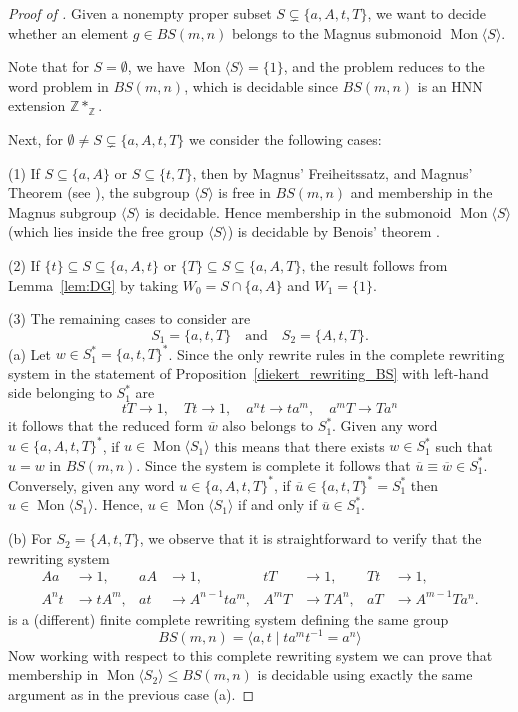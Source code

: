 \documentclass[11pt]{amsart}
\newcommand{\Mgen}[1]{\operatorname{Mon}\bigl\langle #1 \bigr\rangle}
\theoremstyle{plain}
\theoremstyle{definition}
\begin{document}
\begin{proof}[Proof of ]

Given a nonempty proper subset $S \subsetneq \{a, A, t, T\}$, we want to decide whether an element $g \in BS(m,n)$ belongs to the Magnus submonoid $\Mgen{S}$.

Note that for $S = \emptyset$, we have $\Mgen{S} = \{1\}$, and the problem reduces to the word problem in $BS(m,n)$, which is decidable since $BS(m,n)$ is an HNN extension $\mathbb{Z} *_{\mathbb{Z}}$. 


Next, for $\emptyset \neq S \subsetneq \{a, A, t, T\}$ we consider the following cases:


\smallskip
\noindent     (1) If $S \subseteq \{a, A\}$ or $S \subseteq \{t, T\}$, then by Magnus' Freiheitssatz, 
   and Magnus' Theorem (see \cite[Chapter 2, Section 5]{lyndon1977combinatorial}),  
    the subgroup $\langle S \rangle$ is free in $BS(m,n)$ and membership in the Magnus subgroup $\langle S \rangle$ is decidable. Hence membership in the submonoid $\Mgen{S}$ (which lies inside the free group $\langle S \rangle$) is decidable by Benois' theorem \cite{Benois}.


\smallskip
\noindent     (2) If $\{t\} \subseteq S \subseteq \{a, A, t\}$ or $\{T\} \subseteq S \subseteq \{a, A, T\}$, the result follows from Lemma~\ref{lem:DG}  
    by taking $W_0 = S \cap \{a, A\}$ and $W_1 = \{1\}$.

\smallskip
\noindent     (3) The remaining cases to consider are
    \[
    S_1 = \{a, t, T\} \quad \text{and} \quad S_2 = \{A, t, T\}.
    \]
\noindent   (a) 
        Let $w \in S_1^\ast = \{a, t, T\}^\ast$. Since the only rewrite rules in the complete rewriting system in the statement of Proposition~\ref{diekert_rewriting_BS} with left-hand side belonging to $S_1^\ast$ are 
        \[
        t T \to 1, \quad T t \to 1, \quad a^n t \to t a^m, \quad  a^m T  \to T a^n
        \]
       it follows that the reduced form $\overline{w}$ also belongs to $S_1^\ast$. 
Given any word $u \in \{a, A, t, T\}^\ast$, if $u \in \Mgen{S_1}$ this means that there exists $w \in S_1^\ast$ such that $u=w$ in $BS(m,n)$. Since the system is complete it follows that $\overline{u} \equiv \overline{w} \in S_1^*$.   
Conversely, given any word $u \in \{a, A, t, T\}^\ast$, if $\overline{u} \in \{a, t, T\}^\ast = S_1^*$ then $u \in \Mgen{S_1}$. 
Hence, $u \in \Mgen{S_1}$ if and only if $\overline{u} \in S_1^\ast$.

\smallskip
\noindent (b) For $S_2 = \{A, t, T\}$, we observe that it is straightforward to verify that the rewriting system
 \begin{align*}
A a &\to 1, & a A &\to 1, &
t T &\to 1, & T t &\to 1, \\
A^n t &\to t A^m, & a t &\to A^{n-1} t a^m, &
A^m T &\to T A^n, & a T &\to A^{m-1} T a^n.
\end{align*}       
is a (different) finite complete rewriting system defining the same group        
\[
BS(m,n) = \langle a, t \mid t a^m t^{-1} = a^n \rangle
\]
Now working with respect to this complete rewriting system we can prove that membership in $\Mgen{S_2} \leq BS(m,n)$ is decidable using exactly the same argument as in the previous case (a).  
\end{proof}
\end{document}
